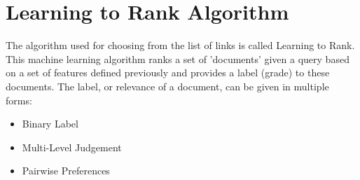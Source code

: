 \section{Learning to Rank Algorithm}

The algorithm used for choosing from the list of links is called Learning to Rank. This machine learning algorithm ranks a set of 'documents' given a query based on a set of features defined previously and provides a label (grade) to these documents. The label, or relevance of a document, can be given in multiple forms:

\begin{itemize}  
\item Binary Label 
\item Multi-Level Judgement 
\item Pairwise Preferences 
\end{itemize}

